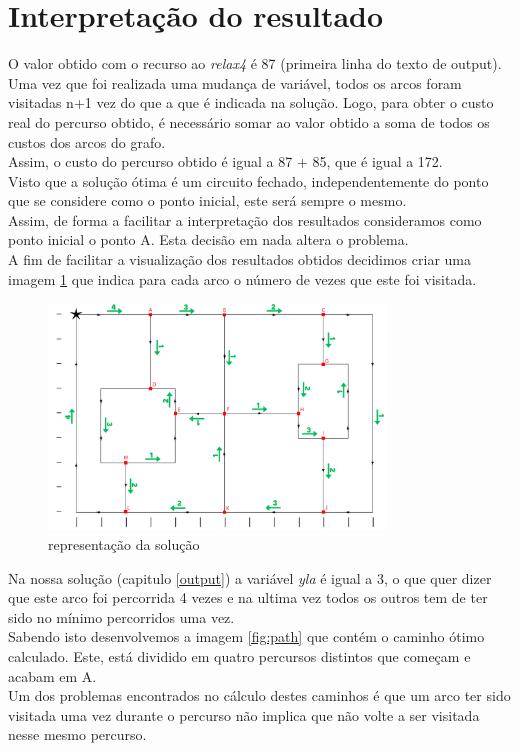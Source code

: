 \documentclass[a4paper]{report}
\begin{document}
\section{Interpretação do resultado}
\label{solution}
O valor obtido com o recurso ao \textit{relax4} é 87 (primeira linha do texto de
output). Uma vez que foi realizada uma mudança de variável, todos os arcos foram
visitadas n+1 vez do que a que é indicada na solução. Logo, para obter o custo
real do percurso obtido, é necessário somar ao valor obtido a soma de todos os
custos dos arcos do grafo.\\
Assim, o custo do percurso obtido é igual a 87 + 85, que é igual a 172.\\
Visto que a solução ótima é um circuito fechado, independentemente do ponto
que se considere como o ponto inicial, este será sempre o mesmo. \\
Assim, de forma a facilitar a interpretação dos resultados consideramos como
ponto inicial o ponto A. Esta decisão em nada altera o problema.\\
A fim de facilitar a visualização dos resultados obtidos decidimos criar uma
imagem \ref{fig:visited} que indica para cada arco o número de vezes que este
foi visitada.

\begin{figure}[H]
    \begin{center}
        \includegraphics[width=0.8\textwidth]{images/desafioVisited.png}\par
        \caption{representação da solução}
        \label{fig:visited}
    \end{center}
\end{figure}
Na nossa solução (capitulo \ref{output}) a variável \textit{yla} é igual a 3, o
que quer dizer que este arco foi percorrida 4 vezes e na ultima vez todos os
outros tem de ter sido no mínimo percorridos uma vez.\\
Sabendo isto desenvolvemos a imagem \ref{fig:path} que contém o caminho ótimo
calculado. Este, está dividido em quatro percursos distintos que começam e
acabam em A.\\
Um dos problemas encontrados no cálculo destes caminhos é que um arco ter sido
visitada uma vez durante o percurso não implica que não volte a ser visitada
nesse mesmo percurso.
\end{document}
